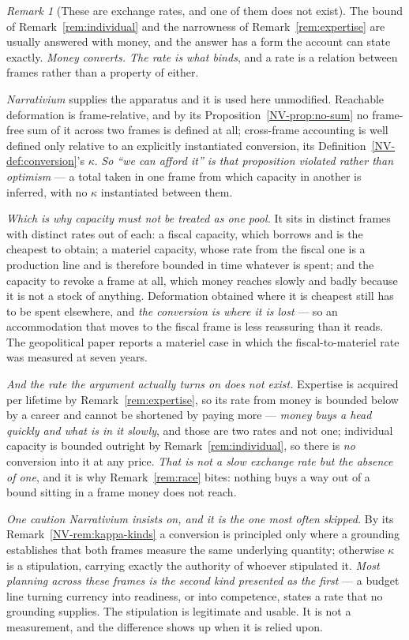 \documentclass[11pt,a4paper]{article}
\theoremstyle{remark}
\newtheorem{remark}[definition]{Remark}
\begin{document}
\begin{remark}[These are exchange rates, and one of them does not exist]\label{rem:exchange}
The bound of Remark~\ref{rem:individual} and the narrowness of Remark~\ref{rem:expertise} are usually
answered with money, and the answer has a form the account can state exactly. \emph{Money converts.
The rate is what binds}, and a rate is a relation between frames rather than a property of either.

\emph{Narrativium} supplies the apparatus and it is used here unmodified. Reachable deformation is
frame-relative, and by its Proposition~\ref{NV-prop:no-sum} no frame-free sum of it across two frames
is defined at all; cross-frame accounting is well defined only relative to an explicitly instantiated
conversion, its Definition~\ref{NV-def:conversion}'s $\kappa$. \emph{So ``we can afford it'' is that
proposition violated rather than optimism} --- a total taken in one frame from which capacity in
another is inferred, with no $\kappa$ instantiated between them.

\emph{Which is why capacity must not be treated as one pool.} It sits in distinct frames with distinct
rates out of each: a fiscal capacity, which borrows and is the cheapest to obtain; a materiel capacity,
whose rate from the fiscal one is a production line and is therefore bounded in time whatever is spent;
and the capacity to revoke a frame at all, which money reaches slowly and badly because it is not a
stock of anything. Deformation obtained where it is cheapest still has to be spent elsewhere, and
\emph{the conversion is where it is lost} --- so an accommodation that moves to the fiscal frame is
less reassuring than it reads. The geopolitical paper reports a materiel case in which the
fiscal-to-materiel rate was measured at seven years.

\emph{And the rate the argument actually turns on does not exist.} Expertise is acquired per lifetime
by Remark~\ref{rem:expertise}, so its rate from money is bounded below by a career and cannot be
shortened by paying more --- \emph{money buys a head quickly and what is in it slowly}, and those are
two rates and not one; individual capacity is bounded outright by Remark~\ref{rem:individual}, so
there is \emph{no} conversion into it at any price. \emph{That is not a slow exchange rate but the
absence of one}, and it is why Remark~\ref{rem:race} bites: nothing buys a way out of a bound sitting
in a frame money does not reach.

\emph{One caution \emph{Narrativium} insists on, and it is the one most often skipped.} By its
Remark~\ref{NV-rem:kappa-kinds} a conversion is principled only where a grounding establishes that both
frames measure the same underlying quantity; otherwise $\kappa$ is a stipulation, carrying exactly the
authority of whoever stipulated it. \emph{Most planning across these frames is the second kind
presented as the first} --- a budget line turning currency into readiness, or into competence, states a
rate that no grounding supplies. The stipulation is legitimate and usable. It is not a measurement, and
the difference shows up when it is relied upon.
\end{remark}
\end{document}
